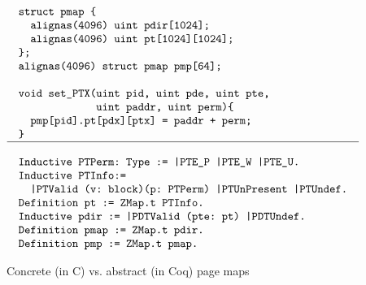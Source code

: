 {\begin{figure}[t]\scriptsize
$$
\begin{array}{l}
\begin{array}{l}
\verb+struct pmap {+\\
\verb+  alignas(4096) uint pdir[1024];+\\
\verb+  alignas(4096) uint pt[1024][1024];+\\
\verb+};+\\
\verb+alignas(4096) struct pmap pmp[64];+\\
\\
\verb+void set_PTX(uint pid, uint pde, uint pte,+\\
\verb+             uint paddr, uint perm){+\\
\verb"  pmp[pid].pt[pdx][ptx] = paddr + perm;"\\
\verb+}+
\end{array}
\\
\hline
\\
\begin{array}{l}
\verb+Inductive PTPerm: Type := |PTE_P |PTE_W |PTE_U.+\\
\verb+Inductive PTInfo:=+\\
\verb+  |PTValid (v: block)(p: PTPerm) |PTUnPresent |PTUndef.+\\
\verb+Definition pt := ZMap.t PTInfo.+\\
\verb+Inductive pdir := |PDTValid (pte: pt) |PDTUndef.+\\
\verb+Definition pmap := ZMap.t pdir.+\\
\verb+Definition pmp := ZMap.t pmap.+
\end{array}
\end{array}
$$ 
\caption{Concrete (in C) vs. abstract (in Coq) page maps}
\label{fig:pmap}
\end{figure}}

